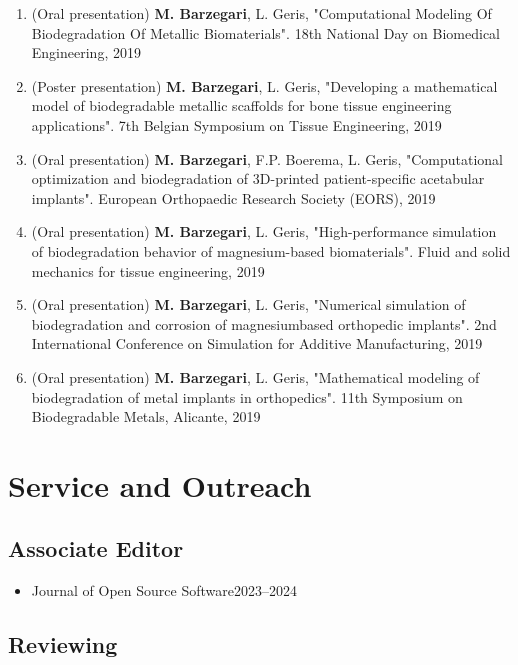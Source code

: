 \documentclass{cv}
\begin{document}
\begin{enumerate}[itemsep=-0.2ex]
\item
(Oral presentation) 
\textbf{M. Barzegari}, L. Geris, "Computational Modeling Of Biodegradation Of Metallic Biomaterials". 18th National Day on Biomedical Engineering, 2019
\item
(Poster presentation) 
\textbf{M. Barzegari}, L. Geris, "Developing a mathematical model of biodegradable metallic scaffolds for bone tissue engineering applications". 7th Belgian Symposium on Tissue Engineering, 2019
\item
(Oral presentation) 
\textbf{M. Barzegari}, F.P. Boerema, L. Geris, "Computational optimization and biodegradation of 3D-printed patient-specific acetabular implants". European Orthopaedic Research Society (EORS), 2019
\item
(Oral presentation) 
\textbf{M. Barzegari}, L. Geris, "High-performance simulation of biodegradation behavior of magnesium-based biomaterials". Fluid and solid mechanics for tissue engineering, 2019
\item
(Oral presentation) 
\textbf{M. Barzegari}, L. Geris, "Numerical simulation of biodegradation and corrosion of magnesiumbased orthopedic implants". 2nd International Conference on Simulation for Additive Manufacturing, 2019
\item
(Oral presentation) 
\textbf{M. Barzegari}, L. Geris, "Mathematical modeling of biodegradation of metal implants in orthopedics". 11th Symposium on Biodegradable Metals, Alicante, 2019
\end{enumerate}



\section{Service and Outreach}

\subsection{Associate Editor}

\begin{itemize}[itemsep=-0.2ex]
\item
Journal of Open Source Software\hfill 2023--2024
\end{itemize}

\subsection{Reviewing}
\end{document}
